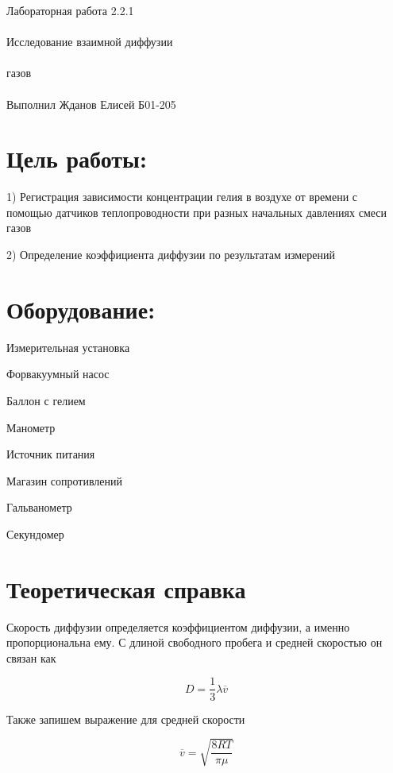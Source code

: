 \documentclass{astroedu-lab}
\begin{document}
\pagestyle{plain}

\begin{problem}{\huge Лабораторная работа 2.2.1\\\\Исследование взаимной диффузии\\\\газов\\\\Выполнил Жданов Елисей Б01-205}

\section{Цель работы:}

1) Регистрация зависимости концентрации гелия в воздухе от времени с помощью датчиков теплопроводности при разных начальных давлениях смеси газов

2) Определение коэффициента диффузии по результатам измерений

\section{Оборудование:}

Измерительная установка

Форвакуумный насос

Баллон с гелием

Манометр

Источник питания

Магазин сопротивлений

Гальванометр

Секундомер

\section{Теоретическая справка}

Скорость диффузии определяется коэффициентом диффузии, а именно пропорциональна ему. С длиной свободного пробега и средней скоростью он связан как

\begin{equation}
	D = \frac{1}{3} \lambda \overline{v}
\end{equation}

Также запишем выражение для средней скорости

\begin{equation}
	\overline{v} = \sqrt{\frac{8 R T}{\pi \mu}}
\end{equation}


\end{problem}
\end{document}

